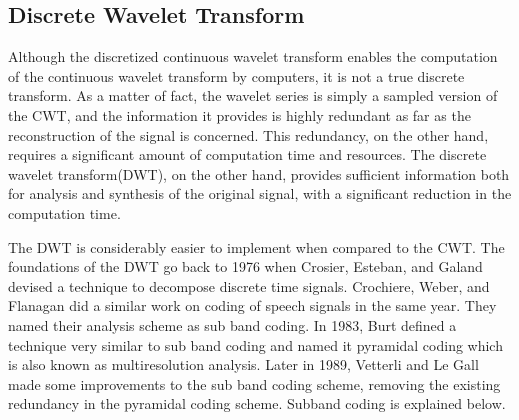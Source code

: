 \documentclass[12pt, a4paper, twoside]{report}
\begin{document}
\subsection{Discrete Wavelet Transform}
Although the discretized continuous wavelet transform enables the computation of the continuous wavelet transform by computers, it is not a true discrete transform. As a matter of fact, the wavelet series is simply a sampled version of the CWT, and the information it provides is highly redundant as far as the reconstruction of the signal is concerned. This redundancy, on the other hand, requires a significant amount of computation time and resources. The discrete wavelet transform(DWT), on the other hand, provides sufficient information both for analysis and synthesis of the original signal, with a significant reduction in the computation time.
\par
The DWT is considerably easier to implement when compared to the CWT. The foundations of the DWT go back to 1976 when Crosier, Esteban, and Galand devised a technique to decompose discrete time signals. Crochiere, Weber, and Flanagan did a similar work on coding of speech signals in the same year. They named their analysis scheme as sub band coding. In 1983, Burt defined a technique very similar to sub band coding and named it pyramidal coding which is also known as multiresolution analysis. Later in 1989, Vetterli and Le Gall made some improvements to the sub band coding scheme, removing the existing redundancy in the pyramidal coding scheme. Subband coding is explained below.
\end{document}
